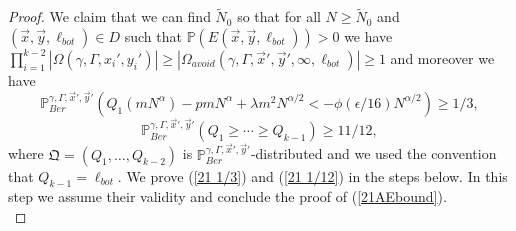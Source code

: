 \begin{proof}
	We claim that we can find $\tilde{N}_0$ so that for all $N\geq\tilde{N}_0$ and $(\vec{x}, \vec{y}, \ell_{bot}) \in D$ such that $\mathbb{P}(E(\vec{x},\vec{y},\ell_{bot})) > 0$ we have $\prod_{i = 1}^{k-2} |\Omega(\gamma, \Gamma, x_i', y_i')| \geq |\Omega_{avoid}(\gamma, \Gamma, \vec{x}', \vec{y}', \infty, \ell_{bot})| \geq 1$ and moreover we have
	\begin{equation}\label{21 1/3}
		\mathbb{P}^{\gamma, \Gamma,\vec{x}',\vec{y}'}_{Ber} \left(  Q_1\left(mN^{\alpha}\right) - pm N^\alpha  + \lambda m^2 N^{\alpha/2} < -\phi(\epsilon/16)N^{\alpha/2}  \right) \geq 1/3,
	\end{equation}
	\begin{equation}\label{21 1/12}
		\mathbb{P}^{\gamma, \Gamma,\vec{x}',\vec{y}'}_{Ber} \left( Q_1 \geq \cdots \geq Q_{k-1} \right) \geq 11/12,
	\end{equation}
	where $\mathfrak{Q} = (Q_1, \dots, Q_{k-2})$ is $\mathbb{P}^{\gamma, \Gamma,\vec{x}',\vec{y}'}_{Ber}$-distributed and we used the convention that $Q_{k-1} = \ell_{bot}$. We prove (\ref{21 1/3}) and (\ref{21 1/12}) in the steps below. In this step we assume their validity and conclude the proof of (\ref{21AEbound}).\\
	

\end{proof}
